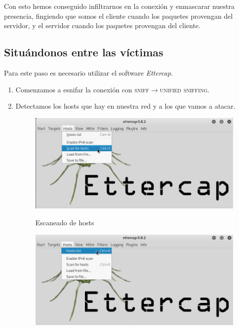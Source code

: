 \documentclass[11pt,a4paper]{article}
\begin{document}
Con esto hemos conseguido infiltrarnos en la conexión y enmascarar nuestra presencia, fingiendo que somos el cliente cuando los paquetes provengan del servidor, y el servidor cuando los paquetes provengan del cliente.

\subsection{Situándonos entre las víctimas}

Para este paso es necesario utilizar el software \textit{Ettercap}.

\begin{enumerate}
    \item Comenzamos a esnifar la conexión con \textsc{sniff}$\rightarrow$\textsc{unified sniffing}.
    \item Detectamos los hosts que hay en nuestra red y a los que vamos a atacar.
        \begin{figure}[H]
            \centering
            \includegraphics[width=1.0\textwidth]{scan_host.png}\\[0.1cm]
            \caption{Escaneado de hosts}
            \label{fig:my_label}
        \end{figure}
        \begin{figure}[H]
            \centering
            \includegraphics[width=1.0\textwidth]{host_list.png}\\[0.1cm]

\end{figure}
\end{enumerate}
\end{document}
